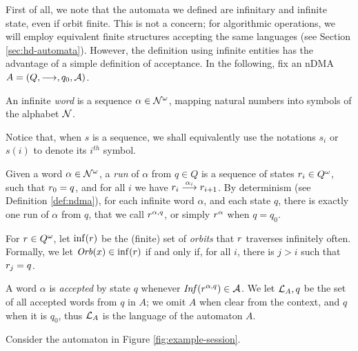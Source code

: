 First of all, we note that the automata we defined are infinitary and infinite state, even if orbit finite. This is not a concern; for algorithmic operations, we will employ equivalent finite structures accepting the same languages (see Section \ref{sec:hd-automata}). However, the definition using infinite entities has the advantage of a simple definition of acceptance. In the following, fix an nDMA $A=(Q,\overset{}{\longrightarrow},q_0,\mathcal{A})$.

\begin{definition}
 An infinite \emph{word} is a sequence $\alpha \in \mathcal{N}^\omega$, mapping natural numbers into symbols of the alphabet $\mathcal{N}$.
\end{definition}

\noindent Notice that, when $s$ is a sequence, we shall equivalently use the notations $s_i$ or $s(i)$ to denote its $i^{\mathit{th}}$ symbol.

\begin{definition}\label{def:nominal-run}
 Given a word $\alpha \in \mathcal{N}^\omega$, a \emph{run} of $\alpha$ from $q \in Q$ is a sequence of states $r_i \in Q^\omega$, such that $r_0 = q$, and for all $i$ we have $r_i \overset{\alpha_i}{\longrightarrow} r_{i+1}$. 
 By determinism (see Definition \ref{def:ndma}), for each infinite word $\alpha$, and each state $q$, there is exactly one run of $\alpha$ from $q$, that we call $r^{\alpha,q}$, or simply $r^{\alpha}$ when $q=q_0$.
\end{definition}

\begin{definition}
 For $r \in Q^\omega$, let $\inf(r)$ be the (finite) set of \emph{orbits} that $r$ traverses infinitely often. Formally, we let $\mathit{Orb}(x) \in \inf(r)$ if and only if, for all $i$, there is $j > i$ such that $r_j = q$. 
\end{definition}

\begin{definition}
 A word $\alpha$ is \emph{accepted} by state $q$ whenever $\mathit{Inf}(r^{\alpha,q}) \in \mathcal{A}$. We let $\mathcal{L}_A,q$ be the set of all accepted words from $q$ in $A$; we omit $A$ when clear from the context, and $q$ when it is $q_0$, thus $\mathcal{L}_A$ is the language of the automaton $A$.
\end{definition}

\begin{example}
 Consider the automaton in Figure \ref{fig:example-session}. 
\end{example}

